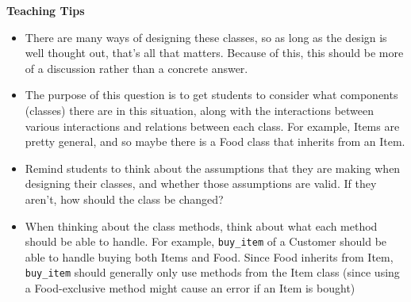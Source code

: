 \begin{blocksection}
\begin{guide}
\textbf{Teaching Tips}
\begin{itemize}
    \item There are many ways of designing these classes, so as long as the design is well thought out, that's all that matters. Because of this, this should be more of a discussion rather than a concrete answer.
    \item The purpose of this question is to get students to consider what components (classes) there are in this situation, along with the interactions between various interactions and relations between each class. For example, Items are pretty general, and so maybe there is a Food class that inherits from an Item.
    \item Remind students to think about the assumptions that they are making when designing their classes, and whether those assumptions are valid. If they aren't, how should the class be changed?
    \item When thinking about the class methods, think about what each method should be able to handle. For example, \lstinline{buy_item} of a Customer should be able to handle buying both Items and Food. Since Food inherits from Item, \lstinline{buy_item} should generally only use methods from the Item class (since using a Food-exclusive method might cause an error if an Item is bought)
\end{itemize}
\end{guide}
\end{blocksection}